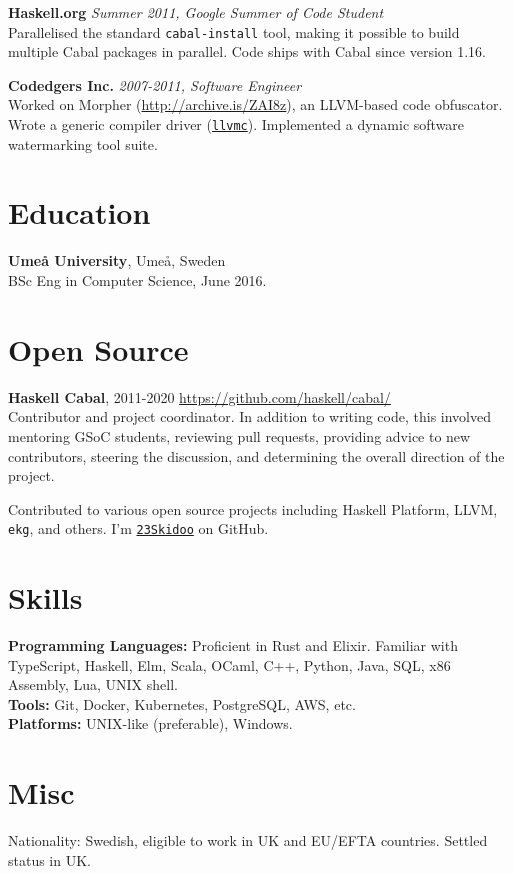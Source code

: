 \documentclass[margin,line]{res}
\begin{document}
\begin{resume}
        {\bf Haskell.org} \hfill {\it Summer 2011, Google Summer of Code Student}\\
    Parallelised the standard \texttt{cabal-install} tool, making it possible to
    build multiple Cabal packages in parallel. Code ships with Cabal since version
    1.16.

        {\bf Codedgers Inc.} \hfill {\it 2007-2011, Software Engineer}\\
    Worked on Morpher (\url{http://archive.is/ZAI8z}), an LLVM-based code
    obfuscator. Wrote a generic compiler driver
    (\href{http://llvm.org/releases/2.9/docs/CompilerDriver.html}{\texttt{llvmc}}). Implemented
    a dynamic software watermarking tool suite.

    \section{\sc Education}
     {\bf Umeå University}, Umeå, Sweden\\
    BSc Eng in Computer Science, June 2016.

    \section{\sc Open Source}

     {\bf Haskell Cabal}, 2011-2020 \hfill \url{https://github.com/haskell/cabal/}\\
    Contributor and project coordinator. In addition to writing code,
    this involved mentoring GSoC students, reviewing pull requests,
    providing advice to new contributors, steering the discussion, and
    determining the overall direction of the project.

    Contributed to various open source projects including Haskell
    Platform, LLVM, \texttt{ekg}, and others. I'm
    \href{https://github.com/23Skidoo/}{\texttt{23Skidoo}} on GitHub.

    \section{\sc Skills}

     {\bf Programming Languages:} Proficient in Rust and Elixir. Familiar
    with TypeScript, Haskell, Elm, Scala, OCaml, C++, Python, Java, SQL, x86 Assembly, Lua, UNIX shell. \\
    {\bf Tools:} Git, Docker, Kubernetes, PostgreSQL, AWS, etc.\\
    {\bf Platforms:} UNIX-like (preferable), Windows.


    \section{\sc Misc}

    Nationality: Swedish, eligible to work in UK and EU/EFTA countries. Settled status in UK.

\end{resume}
\end{document}

